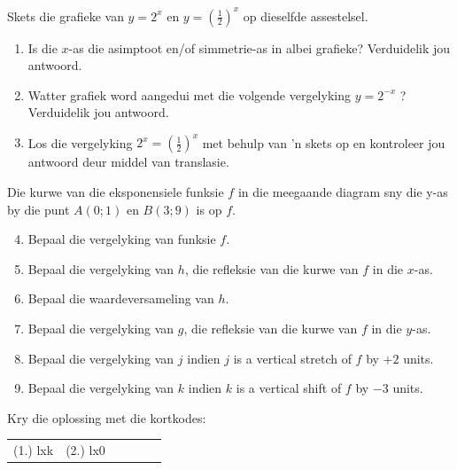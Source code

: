 \begin{exercises}{ }
 {
 
Skets die grafieke van $y=2^{x}$ en $y=(\frac{1}{2})^{x}$ op dieselfde assestelsel.
\begin{enumerate}[noitemsep, label=\textbf{\arabic*}. ] 
\item Is die $x$-as die asimptoot en/of simmetrie-as in albei grafieke? Verduidelik jou antwoord.
\item Watter grafiek word aangedui met die volgende vergelyking $y=2^{-x}$ ? Verduidelik jou antwoord.
\item Los die vergelyking $2^{x}=(\frac{1}{2})^{x}$ met behulp van ’n skets op en kontroleer jou antwoord deur middel van translasie.
\end{enumerate}
Die kurwe van die eksponensiele funksie $f$ in die meegaande diagram sny die y-as by die punt $A(0; 1)$ en $B(3; 9)$ is op $f$.
\begin{enumerate}[noitemsep, label=\textbf{\arabic*}. ] 
\setcounter{enumi}{3}
\item  Bepaal die vergelyking van funksie $f$.
\item  Bepaal die vergelyking van $h$, die refleksie van die kurwe van $f$ in die $x$-as.
\item  Bepaal die waardeversameling van $h$.
\item Bepaal die vergelyking van  $g$, die refleksie van die kurwe van $f$ in die $y$-as.
\item Bepaal die vergelyking van $j$ indien $j$ is a vertical stretch of $f$ by $+2$ units.
\item Bepaal die vergelyking van $k$ indien $k$ is a vertical shift of $f$ by $-3$ units.
\end{enumerate}


\par {} Kry die oplossing met die kortkodes:
\par \begin{tabular}[h]{cccccc}
(1.) lxk  &  (2.) lx0  & \end{tabular}
}
\end{exercises}

